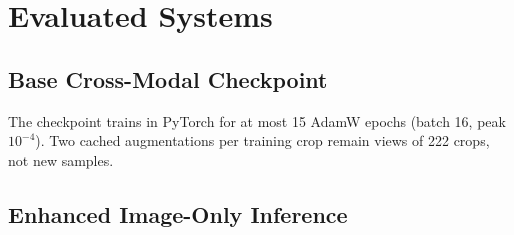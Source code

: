 \documentclass[conference]{IEEEtran}
\begin{document}

\section{Evaluated Systems}
\label{sec:ff}

\subsection{Base Cross-Modal Checkpoint}
\label{sec:proposed}

The checkpoint trains in PyTorch for at most 15 AdamW epochs
(batch 16, peak $10^{-4}$). Two cached augmentations per training crop remain
views of 222 crops, not new samples.

\iffalse
\subsection{Enhanced Image-Only Inference}
\end{document}
